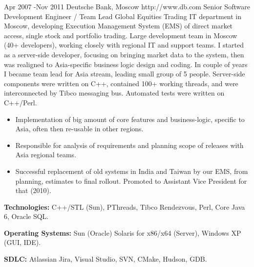 \documentclass[10pt]{article} %
\begin{document}

\job
{Apr 2007 -}{Nov 2011}
{Deutsche Bank, Moscow}
{http://www.db.com}
{Senior Software Development Engineer / Team Lead}
{Global Equities Trading IT department in Moscow, developing Execution Management System (EMS) of direct market access,
single stock and portfolio trading. Large development team in Moscow (40+ developers), working closely with regional IT 
and support teams. I started as a server-side developer, focusing on bringing market data to the system, then was realigned
to Asia-specific business logic design and coding. In couple of years I became team lead for Asia stream, 
leading small group of 5 people. Server-side components were written on C++, contained 100+ working threads,
and were interconnected by Tibco messaging bus. Automated tests were written on C++/Perl.}
{\begin{itemize}
\item{Implementation of big amount of core features and business-logic, specific to Asia, often then re-usable in other regions.}
\item{Responsible for analysis of requirements and planning scope of releases with Asia regional teams.}
\item{Successful replacement of old systems in India and Taiwan by our EMS, from planning, estimates to final rollout.
Promoted to Assistant Vice President for that (2010).}
\end{itemize}}
{\rule{0mm}{5mm}\textbf{Technologies:} C++/STL (Sun), PThreads, Tibco Rendezvous, Perl, Core Java 6, Oracle SQL.\\
\rule{0mm}{5mm}\textbf{Operating Systems:} Sun (Oracle) Solaris for x86/x64 (Server), Windows XP (GUI, IDE).\\
\rule{0mm}{5mm}\textbf{SDLC:} Atlassian Jira, Visual Studio, SVN, CMake, Hudson, GDB.
}

\clearpage
\end{document}
